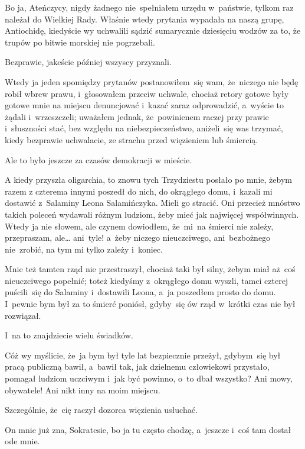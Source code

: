 

Bo ja, Ateńczycy, nigdy żadnego nie~spełniałem urzędu w~państwie,
tylkom raz należał do Wielkiej Rady. Właśnie wtedy prytania wypadała
na naszą grupę, Antiochidę, kiedyście wy uchwalili sądzić sumarycznie
dziesięciu wodzów za to, że trupów po bitwie morskiej nie pogrzebali.

Bezprawie, jakeście później wszyscy przyznali.

Wtedy ja jeden spomiędzy prytanów postanowiłem~się wam, że~niczego nie
będę robił wbrew prawu, i~głosowałem przeciw uchwale, chociaż retory
gotowe były gotowe mnie na miejscu denuncjować i~kazać zaraz
odprowadzić, a~wyście to żądali i~wrzeszczeli; uważałem jednak,
że~powinienem raczej przy prawie i~słuszności stać, bez względu na
niebezpieczeństwo, aniżeli~się was trzymać, kiedy bezprawie
uchwalacie, ze strachu przed więzieniem lub śmiercią.

Ale to było jeszcze za czasów demokracji w mieście.

A kiedy przyszła oligarchia, to znowu tych Trzydziestu posłało po
mnie, żebym razem z czterema innymi poszedł do nich, do okrągłego
domu, i~kazali mi dostawić z~Salaminy Leona Salamińczyka. Mieli go
stracić. Oni przecież mnóstwo takich poleceń wydawali różnym ludziom,
żeby mieć jak najwięcej współwinnych. Wtedy ja nie słowem, ale czynem
dowiodłem, że~mi~na śmierci nie zależy, przepraszam, ale\ldots
ani~tyle! a~żeby niczego nieuczciwego, ani~bezbożnego nie~zrobić, na
tym mi tylko zależy i~koniec.

Mnie też tamten rząd nie przestraszył, chociaż taki był silny, żebym
miał aż~coś nieuczciwego popełnić; toteż kiedyśmy z~okrągłego domu
wyszli, tamci czterej puścili~się do Salaminy i~dostawili Leona, a~ja
poszedłem prosto do domu. I~pewnie bym był za to śmierć poniósł,
gdyby~się ów rząd w~krótki czas nie był rozwiązał.

I~na to znajdziecie wielu świadków.

Cóż wy myślicie, że~ja bym był tyle lat bezpiecznie przeżył,
gdybym~się był pracą publiczną bawił, a~bawił tak, jak dzielnemu
człowiekowi przystało, pomagał ludziom uczciwym i~jak być powinno,
o~to dbał wszystko? Ani mowy, obywatele! Ani nikt inny na moim
miejscu.  


 Szczególnie, że~cię raczył dozorca więzienia usłuchać.

 On mnie już zna, Sokratesie, bo ja tu często chodzę, a~jeszcze i~coś tam dostał ode mnie.

